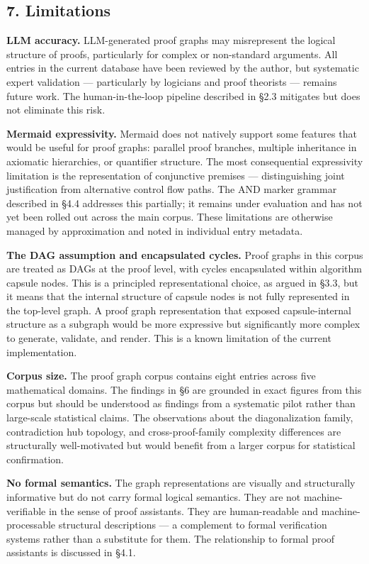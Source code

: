 \documentclass[
  11pt]{article}
\begin{document}
\hypertarget{7-limitations}{%
\subsection{7. Limitations}\label{7-limitations}}

\textbf{LLM accuracy.} LLM-generated proof graphs may misrepresent the
logical structure of proofs, particularly for complex or non-standard
arguments. All entries in the current database have been reviewed by the
author, but systematic expert validation --- particularly by logicians
and proof theorists --- remains future work. The human-in-the-loop
pipeline described in §2.3 mitigates but does not eliminate this risk.

\textbf{Mermaid expressivity.} Mermaid does not natively support some
features that would be useful for proof graphs: parallel proof branches,
multiple inheritance in axiomatic hierarchies, or quantifier structure.
The most consequential expressivity limitation is the representation of
conjunctive premises --- distinguishing joint justification from
alternative control flow paths. The AND marker grammar described in §4.4
addresses this partially; it remains under evaluation and has not yet
been rolled out across the main corpus. These limitations are otherwise
managed by approximation and noted in individual entry metadata.

\textbf{The DAG assumption and encapsulated cycles.} Proof graphs in
this corpus are treated as DAGs at the proof level, with cycles
encapsulated within algorithm capsule nodes. This is a principled
representational choice, as argued in §3.3, but it means that the
internal structure of capsule nodes is not fully represented in the
top-level graph. A proof graph representation that exposed
capsule-internal structure as a subgraph would be more expressive but
significantly more complex to generate, validate, and render. This is a
known limitation of the current implementation.

\textbf{Corpus size.} The proof graph corpus contains eight entries
across five mathematical domains. The findings in §6 are grounded in
exact figures from this corpus but should be understood as findings from
a systematic pilot rather than large-scale statistical claims. The
observations about the diagonalization family, contradiction hub
topology, and cross-proof-family complexity differences are structurally
well-motivated but would benefit from a larger corpus for statistical
confirmation.

\textbf{No formal semantics.} The graph representations are visually and
structurally informative but do not carry formal logical semantics. They
are not machine-verifiable in the sense of proof assistants. They are
human-readable and machine-processable structural descriptions --- a
complement to formal verification systems rather than a substitute for
them. The relationship to formal proof assistants is discussed in §4.1.
\end{document}
